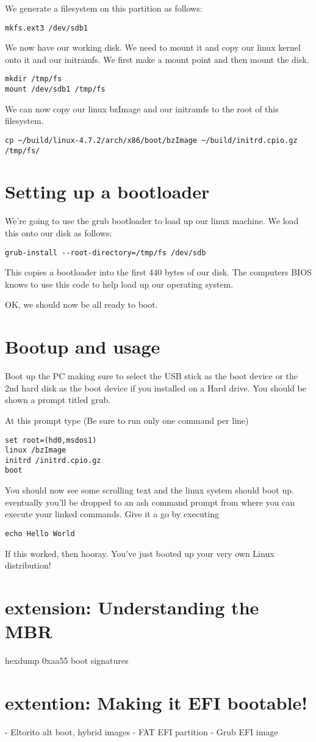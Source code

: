 \documentclass[twocolumn]{article}
\begin{document}
We generate a filesystem on this partition as follows:
\begin{lstlisting}
mkfs.ext3 /dev/sdb1
\end{lstlisting}
We now have our working disk. We need to mount it and copy our linux kernel onto it and our initramfs. We first make a mount point and then mount the disk.
\begin{lstlisting}
mkdir /tmp/fs
mount /dev/sdb1 /tmp/fs
\end{lstlisting}
We can now copy our linux bzImage and our initramfs to the root of this filesystem.
\begin{lstlisting}
cp ~/build/linux-4.7.2/arch/x86/boot/bzImage ~/build/initrd.cpio.gz /tmp/fs/
\end{lstlisting}

\section{Setting up a bootloader}
We're going to use the grub bootloader to load up our linux machine. We load this onto our disk as follows:
\begin{lstlisting}
grub-install --root-directory=/tmp/fs /dev/sdb
\end{lstlisting}

This copies a bootloader into the first 440 bytes of our disk. The computers BIOS knows to use this code to help load up our operating system.

OK, we should now be all ready to boot.

\section{Bootup and usage}

Boot up the PC making sure to select the USB stick as the boot device or the 2nd hard disk as the boot device if you installed on a Hard drive. You should be shown a prompt titled grub.

At this prompt type (Be sure to run only one command per line)
\begin{lstlisting}
set root=(hd0,msdos1)
linux /bzImage
initrd /initrd.cpio.gz
boot
\end{lstlisting}

You should now see some scrolling text and the linux system should boot up. eventually you'll be dropped to an ash command prompt from where you can execute your linked commands. Give it a go by executing
\begin{lstlisting}
echo Hello World
\end{lstlisting}

If this worked, then hooray. You've just booted up your very own Linux distribution!

\section{extension: Understanding the MBR}
hexdump 0xaa55 boot signatures

\section{extention: Making it EFI bootable!}

- Eltorito alt boot, hybrid images
- FAT EFI partition
- Grub EFI image
\end{document}
